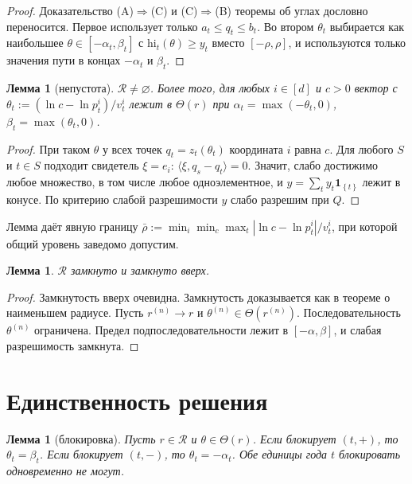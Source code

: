 \documentclass[a4paper,11pt]{article}
\theoremstyle{plain}
\newtheorem{lemma}[theorem]{Лемма}
\theoremstyle{definition}
\theoremstyle{remark}
\newcommand{\abs}[1]{\left\lvert #1 \right\rvert}
\newcommand{\set}[1]{\left\{ #1 \right\}}
\newcommand{\ip}[2]{\langle #1, #2\rangle}
\begin{document}
\begin{proof}
    Доказательство (A)$\Rightarrow$(C) и (C)$\Rightarrow$(B) теоремы об углах дословно переносится. Первое использует только $a_t\le q_t\le b_t$. Во втором $\theta_t$ выбирается как наибольшее $\theta\in[-\alpha_t,\beta_t]$ с $\mathrm{hi}_t(\theta)\ge y_t$ вместо $[-\rho,\rho]$, и используются только значения пути в концах $-\alpha_t$ и $\beta_t$.
\end{proof}

\begin{lemma}[непустота]\label{lem:nonempty}
    $\mathcal R\ne\varnothing$. Более того, для любых $i\in[d]$ и $c>0$ вектор с $\theta_t:=(\ln c-\ln p^i_t)/v^i_t$ лежит в $\Theta(r)$ при $\alpha_t=\max(-\theta_t,0)$, $\beta_t=\max(\theta_t,0)$.
\end{lemma}

\begin{proof}
    При таком $\theta$ у всех точек $q_t=z_t(\theta_t)$ координата $i$ равна $c$. Для любого $S$ и $t\in S$ подходит свидетель $\xi=e_i$: $\ip{\xi}{q_s-q_t}=0$. Значит, слабо достижимо любое множество, в том числе любое одноэлементное, и $y=\sum_ty_t\mathbf 1_{\set t}$ лежит в конусе. По критерию слабой разрешимости $y$ слабо разрешим при $Q$.
\end{proof}

Лемма даёт явную границу $\bar\rho:=\min_i\min_c\max_t\abs{\ln c-\ln p^i_t}/v^i_t$, при которой общий уровень заведомо допустим.

\begin{lemma}\label{lem:closed}
    $\mathcal R$ замкнуто и замкнуто вверх.
\end{lemma}

\begin{proof}
    Замкнутость вверх очевидна. Замкнутость доказывается как в теореме о наименьшем радиусе. Пусть $r^{(n)}\to r$ и $\theta^{(n)}\in\Theta(r^{(n)})$. Последовательность $\theta^{(n)}$ ограничена. Предел подпоследовательности лежит в $[-\alpha,\beta]$, и слабая разрешимость замкнута.
\end{proof}

\section{Единственность решения}

\begin{lemma}[блокировка]\label{lem:block}
    Пусть $r\in\mathcal R$ и $\theta\in\Theta(r)$. Если блокирует $(t,+)$, то $\theta_t=\beta_t$. Если блокирует $(t,-)$, то $\theta_t=-\alpha_t$. Обе единицы года $t$ блокировать одновременно не могут.
\end{lemma}
\end{document}
